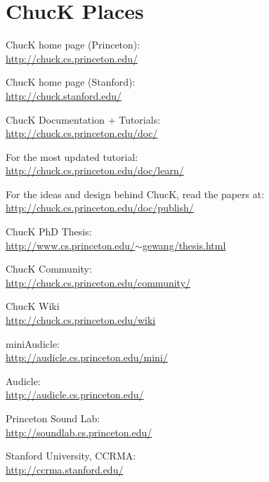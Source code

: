 \newpage
\section{ChucK Places}


ChucK home page (Princeton):\\
\urltab    \href{http://chuck.cs.princeton.edu/}{http://chuck.cs.princeton.edu/}

ChucK home page (Stanford):\\
\urltab    \href{http://chuck.stanford.edu/}{http://chuck.stanford.edu/}

ChucK Documentation + Tutorials:\\
\urltab    \href{http://chuck.cs.princeton.edu/doc/}{http://chuck.cs.princeton.edu/doc/}

For the most updated tutorial:\\
\urltab    \href{http://chuck.cs.princeton.edu/doc/learn/}{http://chuck.cs.princeton.edu/doc/learn/}

For the ideas and design behind ChucK, read the papers at:\\
\urltab    \href{http://chuck.cs.princeton.edu/doc/publish/}{http://chuck.cs.princeton.edu/doc/publish/}
    
ChucK PhD Thesis:\\
\urltab    \href{http://www.cs.princeton.edu/~gewang/thesis.html}{http://www.cs.princeton.edu/$\sim$gewang/thesis.html}

ChucK Community:\\
\urltab    \href{http://chuck.cs.princeton.edu/community/}{http://chuck.cs.princeton.edu/community/}

ChucK Wiki\\
\urltab    \href{http://chuck.cs.princeton.edu/wiki}{http://chuck.cs.princeton.edu/wiki}

miniAudicle:\\
\urltab    \href{http://audicle.cs.princeton.edu/mini/}{http://audicle.cs.princeton.edu/mini/}

Audicle:\\
\urltab    \href{http://audicle.cs.princeton.edu/}{http://audicle.cs.princeton.edu/}

Princeton Sound Lab:\\
\urltab    \href{http://soundlab.cs.princeton.edu/}{http://soundlab.cs.princeton.edu/}  
    
Stanford University, CCRMA:\\
\urltab    \href{http://ccrma.stanford.edu/}{http://ccrma.stanford.edu/}  
